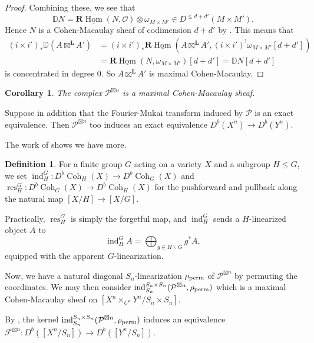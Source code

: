 \documentclass{amsart}
\theoremstyle{plain}
\newtheorem{corollary}[theorem]{Corollary}
\theoremstyle{definition}
\newtheorem{definition}[theorem]{Definition}
\theoremstyle{remark}
\begin{document}
\begin{proof}
        Combining these, we see that
        \[\mathbb DN=\mathbf R\underline{\operatorname{Hom}}(N,\mathcal O)\otimes\omega_{M\times M'}\in D^{\le d+d'}(M\times M').\]
        Hence $N$ is a Cohen-Macaulay sheaf of codimension $d+d'$ by \cite[Lemma 7.7]{arinkin}.
        This means that
        \begin{align*}
            (i\times i')_\ast\mathbb D(A\boxtimes^{\mathbf L}A')&=(i\times i')_\ast\mathbf R\underline{\operatorname{Hom}}(A\boxtimes^{\mathbf L}A',(i\times i')^!\omega_{M\times M'}[d+d'])\\
            &=\mathbf R\underline{\operatorname{Hom}}(N,\omega_{M\times M'})[d+d']=\mathbb DN[d+d']
        \end{align*}
        is concentrated in degree $0$.
        So $A\boxtimes^{\mathbf L}A'$ is maximal Cohen-Macaulay.
    \end{proof}
    \begin{corollary}
        The complex $\mathcal P^{\boxtimes n}$ is a maximal Cohen-Macaulay sheaf.
    \end{corollary}
    Suppose in addition that the Fourier-Mukai transform induced by $\mathcal P$ is an exact equivalence.
    Then $\mathcal P^{\boxtimes n}$ too induces an exact equivalence $D^b(X^n)\to D^b(Y^n)$.

    The work of \cite{ploog} shows we have more.
    \begin{definition}
        For a finite group $G$ acting on a variety $X$ and a subgroup $H\le G$, we set $\operatorname{ind}_H^G:D^b\operatorname{Coh}_H(X)\to D^b\operatorname{Coh}_G(X)$ and $\operatorname{res}_H^G:D^b\operatorname{Coh}_G(X)\to D^b\operatorname{Coh}_H(X)$ for the pushforward and pullback along the natural map $[X/H]\to [X/G]$.
    \end{definition}
    Practically, $\operatorname{res}_H^G$ is simply the forgetful map, and $\operatorname{ind}_H^G$ sends a $H$-linearized object $A$ to
    \[
    \operatorname{ind}_H^GA=\bigoplus_{g\in H\backslash G}g^\ast A,
    \]
    equipped with the apparent $G$-linearization.

    Now, we have a natural diagonal $S_n$-linearization $\rho_{\rm perm}$ of $\mathcal P^{\boxtimes n}$ by permuting the coordinates.
    We may then consider $\operatorname{ind}_{S_n}^{S_n\times S_n}(\mathcal P^{\boxtimes n},\rho_{\rm perm})$ which is a maximal Cohen-Macaulay sheaf on $[X^n\times_{C^n}Y^n/S_n\times S_n]$.

    By \cite[Lemma 5(5)]{ploog}, the kernel $\operatorname{ind}_{S_n}^{S_n\times S_n}(\mathcal P^{\boxtimes n},\rho_{\rm perm})$ induces an equivalence $\mathcal F^{\boxtimes n}:D^b([X^n/S_n])\to D^b([Y^n/S_n])$.
\end{document}
